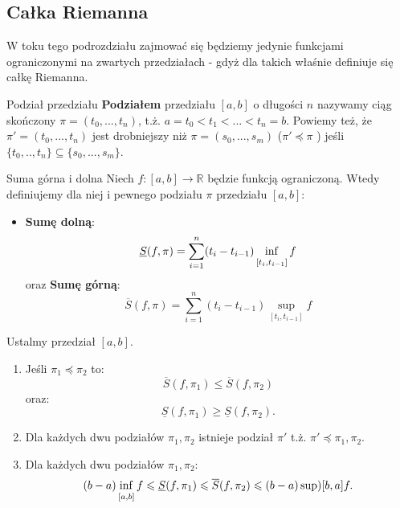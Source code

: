 \documentclass{article}
\newcounter{defi}
\numberwithin{defi}{section}
\numberwithin{defi}{section}
\newcommand{\R}{\mathbb{R}}
\newcommand{\se}{\subseteq}
\renewcommand{\inf}{\mathop{\mathrm{inf}\vphantom{\mathrm{sup}}}}
\newcommand{\Sd}{\underline{S}}
\newcommand{\Sg}{\overline{S}}
\newcommand{\przedz}[2]{[#1 _ {#2}, #1_{#2 - 1}]}
\renewcommand{\geq}{\geqslant}
\renewcommand{\leq}{\leqslant}
\newcommand{\tb}[1]{\textbf{#1}}
\begin{document}
\subsection{Całka Riemanna}
W toku tego podrozdziału zajmować się będziemy jedynie funkcjami ograniczonymi na zwartych przedziałach - gdyż dla takich właśnie definiuje się całkę Riemanna.
\begin{defr}{Podział przedziału}
    \textbf{Podziałem} przedziału $[a, b]$  o długości $n$ nazywamy ciąg skończony $\pi = (t_0, ..., t_n)$, t.ż. $a = t_0 < t_1 < ... < t_n = b$. Powiemy też, że $\pi' = (t_0, ..., t_n)$ jest drobniejszy niż $\pi = (s_0, ..., s_m)$ ($\pi' \preceq \pi$ ) jeśli $\{t_0, .., t_n\} \se \{ s_0, ..., s_m\}$.
\end{defr} 
\begin{defr}{Suma górna i dolna}
    Niech $f:[a, b] \to \R$ będzie funkcją ograniczoną. Wtedy definiujemy dla niej i pewnego podziału $\pi$ przedziału $[a, b]$: \begin{itemize}
        \item \textbf{Sumę dolną}: \begin{equation}
            \Sd (f, \pi) = \sum_{i = 1}^{n} (t_i - t_{i - 1})\inf_{\przedz{t}{i}} f  
        \end{equation} oraz \tb{Sumę górną}: \begin{equation}
            \Sg (f, \pi) = \sum_{i = 1}^{n} (t_i - t_{i - 1})\sup_{\przedz{t}{i}} f  
        \end{equation}
    \end{itemize}
\end{defr}

\begin{twier}{}
    Ustalmy przedział $[a, b]$.
    \begin{enumerate}
        \item Jeśli $\pi_1 \preceq \pi_2$ to: \begin{equation}
            \Sg (f, \pi_1) \leq \Sg(f, \pi_2) 
        \end{equation} oraz: \begin{equation}
            \Sd (f, \pi_1) \geq \Sd(f, \pi_2).
        \end{equation}
        \item Dla każdych dwu podziałów $\pi_1, \pi_2$ istnieje podział $\pi'$ t.ż. $\pi' \preceq \pi_1, \pi_2$.
        \item Dla każdych dwu podziałów $\pi_1, \pi_2$: \begin{equation}
            (b - a) \inf_{[a, b]} f \leq \Sd(f, \pi_1) \leq \Sg(f, \pi_2) \leq (b - a) \sup){[b, a]} f.
        \end{equation}
    \end{enumerate}
\end{twier}
\end{document}
